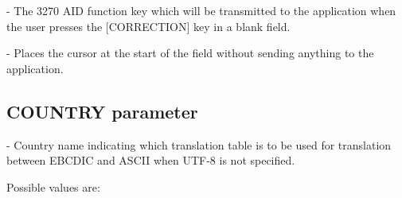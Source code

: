 \documentclass[letterpaper,10pt,english]{sphinxmanual}
\begin{document}
 - The 3270 AID function key which will be transmitted to the application when the user presses the {[}CORRECTION{]} key in a blank field.

 - Places the cursor at the start of the field without sending anything to the application.


\subsection{COUNTRY parameter}
\label{\detokenize{Installation_Guide:country-parameter}}\label{\detokenize{Installation_Guide:index-47}}
\begin{sphinxVerbatim}[commandchars=\\\{\}]
 
\end{sphinxVerbatim}

 - Country name indicating which translation table is to be used for translation between EBCDIC and ASCII when UTF-8 is not specified.

Possible values are:
\end{document}
